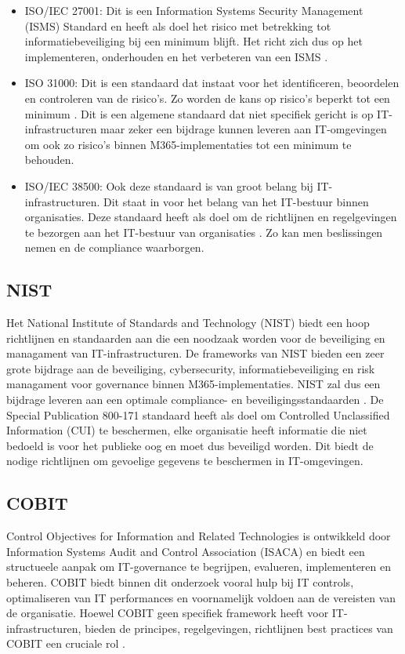 \begin{itemize}
\begin{itemize}
  \item ISO/IEC 27001:
  Dit is een Information Systems Security Management (ISMS) Standard en heeft als doel het risico met betrekking tot informatiebeveiliging bij een minimum blijft. Het richt zich dus op het implementeren, onderhouden en het verbeteren van een ISMS \autocite{VladisLavV.2008}.
  \item ISO 31000:
  Dit is een standaard dat instaat voor het identificeren, beoordelen en controleren van de risico's. Zo worden de kans op risico's beperkt tot een minimum \autocite{Carole2012}.
  Dit is een algemene standaard dat niet specifiek gericht is op IT-infrastructuren maar zeker een bijdrage kunnen leveren aan IT-omgevingen om ook zo risico's binnen M365-implementaties tot een minimum te behouden.
  \item ISO/IEC 38500:
  Ook deze standaard is van groot belang bij IT-infrastructuren. Dit staat in voor het belang van het IT-bestuur binnen organisaties. Deze standaard heeft als doel om de richtlijnen en regelgevingen te bezorgen aan het IT-bestuur van organisaties \autocite{Alan2023}. Zo kan men beslissingen nemen en de compliance waarborgen.

\end{itemize}

\subsection{NIST}
Het National Institute of Standards and Technology (NIST) biedt een hoop richtlijnen en standaarden aan die een noodzaak worden voor de beveiliging en managament van IT-infrastructuren. De frameworks van NIST bieden een zeer grote bijdrage aan de beveiliging, cybersecurity, informatiebeveiliging en risk managament voor governance binnen M365-implementaties.
NIST zal dus een bijdrage leveren aan een optimale compliance- en beveiligingsstandaarden \autocite{Sultan2017}.
De Special Publication 800-171 standaard heeft als doel om Controlled Unclassified Information (CUI) te beschermen, elke organisatie heeft informatie die niet bedoeld is voor het publieke oog en moet dus beveiligd worden. Dit biedt de nodige richtlijnen om gevoelige gegevens te beschermen in IT-omgevingen.

\subsection{COBIT}
Control Objectives for Information and Related Technologies is ontwikkeld door Information Systems Audit and Control Association (ISACA) en biedt een structueele aanpak om IT-governance te begrijpen, evalueren, implementeren en beheren. COBIT biedt binnen dit onderzoek vooral hulp bij IT controls, optimaliseren van IT performances en voornamelijk voldoen aan de vereisten van de organisatie.
Hoewel COBIT geen specifiek framework heeft voor IT-infrastructuren, bieden de principes, regelgevingen, richtlijnen best practices van COBIT een cruciale rol \autocite{George2014}. 


\end{itemize}
